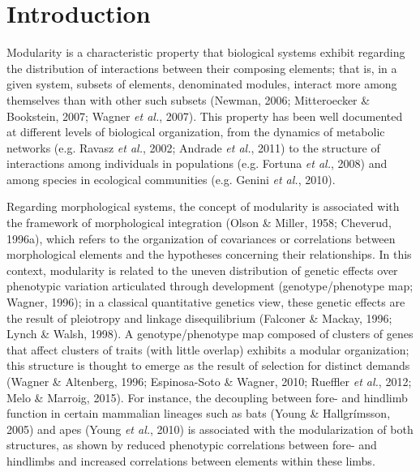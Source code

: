 \documentclass[12pt,twoside]{report}
\begin{document}
\section{Introduction}\label{introduction}

Modularity is a characteristic property that biological systems exhibit
regarding the distribution of interactions between their composing
elements; that is, in a given system, subsets of elements, denominated
modules, interact more among themselves than with other such subsets
(Newman, 2006; Mitteroecker \& Bookstein, 2007; Wagner \emph{et al.},
2007). This property has been well documented at different levels of
biological organization, from the dynamics of metabolic networks (e.g.
Ravasz \emph{et al.}, 2002; Andrade \emph{et al.}, 2011) to the
structure of interactions among individuals in populations (e.g. Fortuna
\emph{et al.}, 2008) and among species in ecological communities (e.g.
Genini \emph{et al.}, 2010).

Regarding morphological systems, the concept of modularity is associated
with the framework of morphological integration (Olson \& Miller, 1958;
Cheverud, 1996a), which refers to the organization of covariances or
correlations between morphological elements and the hypotheses
concerning their relationships. In this context, modularity is related
to the uneven distribution of genetic effects over phenotypic variation
articulated through development (genotype/phenotype map; Wagner, 1996);
in a classical quantitative genetics view, these genetic effects are the
result of pleiotropy and linkage disequilibrium (Falconer \& Mackay,
1996; Lynch \& Walsh, 1998). A genotype/phenotype map composed of
clusters of genes that affect clusters of traits (with little overlap)
exhibits a modular organization; this structure is thought to emerge as
the result of selection for distinct demands (Wagner \& Altenberg, 1996;
Espinosa-Soto \& Wagner, 2010; Rueffler \emph{et al.}, 2012; Melo \&
Marroig, 2015). For instance, the decoupling between fore- and hindlimb
function in certain mammalian lineages such as bats (Young \&
Hallgrímsson, 2005) and apes (Young \emph{et al.}, 2010) is associated
with the modularization of both structures, as shown by reduced
phenotypic correlations between fore- and hindlimbs and increased
correlations between elements within these limbs.
\end{document}
